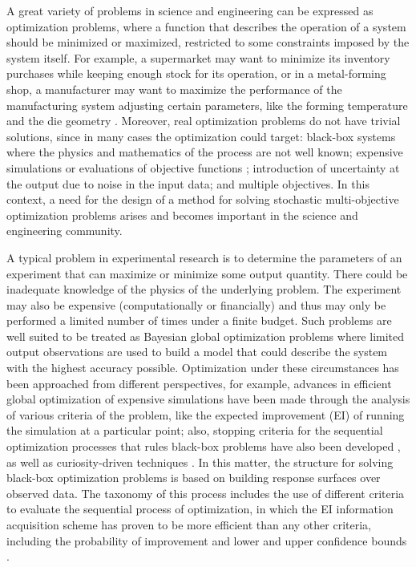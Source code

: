 \documentclass{article}
\begin{document}
A great variety of problems in science and engineering can be expressed as optimization problems, where a function that describes the operation of a system should be minimized or maximized, restricted to some constraints imposed by the system itself. For example, a supermarket may want to minimize its inventory purchases while keeping enough stock for its operation, or in a metal-forming shop, a manufacturer may want to maximize the performance of the manufacturing system adjusting certain parameters, like the forming temperature and the die geometry \cite{Huang2006}. Moreover, real optimization problems do not have trivial solutions, since in many cases the optimization could target: black-box systems where the physics and mathematics of the process are not well known; expensive simulations or evaluations of objective functions \cite{Jones1998}; introduction of uncertainty at the output due to noise in the input data; and multiple objectives. In this context, a need for the design of a method for solving stochastic multi-objective optimization problems arises and becomes important in the science and engineering community.

A typical problem in experimental research is to determine the parameters of an experiment that can maximize or minimize some output quantity. There could be inadequate knowledge of the physics of the underlying problem. The experiment may also be expensive (computationally or financially) and thus may only be performed  a limited number of times under a finite budget. Such problems are well suited to be treated as Bayesian global optimization problems where limited output observations are used to build a model that could describe the system with the highest accuracy possible. Optimization under these circumstances has been approached from different perspectives, for example, advances in efficient global optimization of expensive simulations have been made through the analysis of various criteria of the problem, like the expected improvement (EI) of running the simulation at a particular point; also, stopping criteria for the sequential optimization processes that rules black-box problems have also been developed \cite{Jones1998}, as well as curiosity-driven techniques \cite{Schaul2011}. In this matter, the structure for solving black-box optimization problems is based on building response surfaces over observed data. The taxonomy of this process includes the use of different criteria to evaluate the sequential process of optimization, in which the EI information acquisition scheme has proven to be more efficient than any other criteria, including the probability of improvement and lower and upper confidence bounds \cite{Jones2001}.
\end{document}

